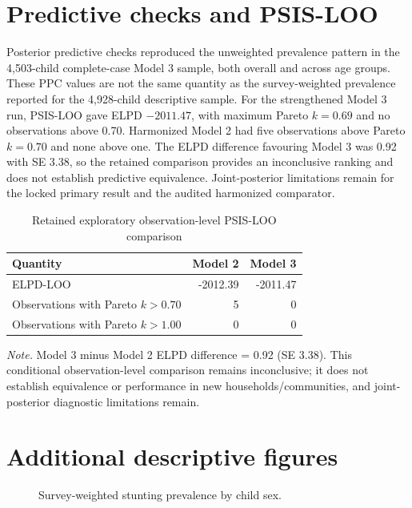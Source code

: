 \documentclass[10pt]{article}
\begin{document}
\section{Predictive checks and PSIS-LOO}

Posterior predictive checks reproduced the unweighted prevalence pattern in the 4,503-child complete-case Model 3 sample, both overall and across age groups. These PPC values are not the same quantity as the survey-weighted prevalence reported for the 4,928-child descriptive sample. For the strengthened Model 3 run, PSIS-LOO gave ELPD $-2011.47$, with maximum Pareto $k=0.69$ and no observations above 0.70. Harmonized Model 2 had five observations above Pareto $k=0.70$ and none above one. The ELPD difference favouring Model 3 was 0.92 with SE 3.38, so the retained comparison provides an inconclusive ranking and does not establish predictive equivalence. Joint-posterior limitations remain for the locked primary result and the audited harmonized comparator.




\begin{table}[H]
\centering
\caption{Retained exploratory observation-level PSIS-LOO comparison}
\small
\begin{tabular}{lrr}
\toprule
Quantity & Model 2 & Model 3 \\
\midrule
ELPD-LOO & -2012.39 & -2011.47 \\
Observations with Pareto $k>0.70$ & 5 & 0 \\
Observations with Pareto $k>1.00$ & 0 & 0 \\
\bottomrule
\end{tabular}
\begin{minipage}{0.98\textwidth}\footnotesize \textit{Note.} Model 3 minus Model 2 ELPD difference = 0.92 (SE 3.38). This conditional observation-level comparison remains inconclusive; it does not establish equivalence or performance in new households/communities, and joint-posterior diagnostic limitations remain.\end{minipage}
\end{table}

\section{Additional descriptive figures}

\begin{figure}[H]
\centering

\caption{Survey-weighted stunting prevalence by child sex.}
\end{figure}
\end{document}
